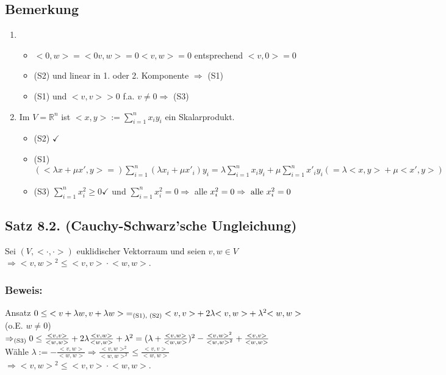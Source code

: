 \documentclass[a4paper, 12pt]{extarticle}
\newcommand{\tn}[1]{\textnormal {#1}}
\begin{document}
\subsection*{Bemerkung}
\begin{enumerate} [label=\arabic*)]
	\item \begin{itemize}
		\item ${<0, w>} = {<0v, w>} = 0{<v, w>} = 0$ entsprechend ${<v, 0>} = 0$
		\item (S2) und linear in 1. oder 2. Komponente $\Rightarrow$ (S1)
		\item (S1) und ${<v, v>} > 0$ f.a. $v \neq 0 \Rightarrow$ (S3)
	\end{itemize}
	\item Im $V = \mathbb{R}^n$ ist ${<x, y>} := \sum_{i=1}^{n}x_iy_i$ ein Skalarprodukt.\\
	\begin{itemize}
		\item (S2) $\checkmark$
		\item (S1) $({<\lambda x+\mu x', y>} =)\sum_{i=1}^{n}(\lambda x_i+\mu x'_i)y_i = \lambda\sum_{i=1}^{n}x_iy_i+\mu\sum_{i=1}^{n}x'_iy_i (= \lambda{<x, y>}+\mu{<x', y>})$
		\item (S3) $\sum_{i=1}^{n}x_i^2 \geq 0 \checkmark$ und $\sum_{i=1}^{n}x_i^2 = 0 \Rightarrow$ alle $x_i^2 = 0 \Rightarrow \tn{ alle } x_i^2 = 0$
	\end{itemize}
\end{enumerate}

\subsection*{Satz 8.2. (Cauchy-Schwarz'sche Ungleichung)}
Sei $(V, <\cdot, \cdot>)$ euklidischer Vektorraum und seien $v, w \in V$\\
$\Rightarrow {<v, w>}^2 \leq {<v, v>} \cdot {<w, w>}$.

\subsubsection*{Beweis:}
Ansatz $0 \leq {<v+\lambda w, v+\lambda w>} =_{\tn{(S1), (S2)}} {<v, v>}+2\lambda {<v, w>}+\lambda^2{<w, w>}$\\
(o.E. $w \neq 0$) $\Rightarrow_{\tn{(S3)}} 0 \leq \frac{<v, v>}{<w, w>}+2\lambda \frac{<v, w>}{<w, w>}+\lambda^2 = (\lambda + \frac{<v, w>}{<w, w>})^2-\frac{<v, w>^2}{<w, w>^2}+\frac{<v, v>}{<w, w>}$\\
Wähle $\lambda := -\frac{<v, w>}{<w, w>} \Rightarrow \frac{<v, w>^2}{<w, w>^2} \leq \frac{<v, v>}{<w, w>}$\\
$\Rightarrow {<v, w>}^2 \leq {<v, v>} \cdot {<w, w>}$.
\end{document}
